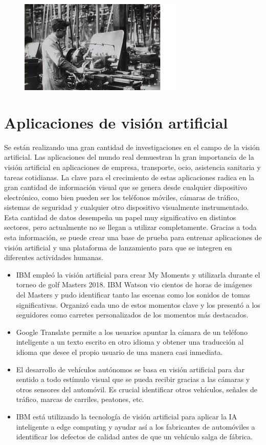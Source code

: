 \begin{figure}[H]
    \centering
    \includegraphics[width=0.5\linewidth]{Images/historia_vision_artificialjpeg.jpeg}
\end{figure}

\newpage
\section{Aplicaciones de visión artificial}
Se están realizando una gran cantidad de investigaciones en el campo de la visión artificial. Las aplicaciones del mundo real demuestran la gran importancia de la visión artificial en aplicaciones de empresa, transporte, ocio, asistencia sanitaria y tareas cotidianas. La clave para el crecimiento de estas aplicaciones radica en la gran cantidad de información visual que se genera desde cualquier dispositivo electrónico, como bien pueden ser los teléfonos móviles, cámaras de tráfico, sistemas de seguridad y cualquier otro dispositivo visualmente instrumentado. Esta cantidad de datos desempeña un papel muy significativo en distintos sectores, pero actualmente no se llegan a utilizar completamente. Gracias a toda esta información, se puede crear una base de prueba para entrenar aplicaciones de visión artificial y una plataforma de lanzamiento para que se integren en diferentes actividades humanas.

\begin{itemize}
    \item IBM empleó la visión artificial para crear My Moments y utilizarla durante el torneo de golf Masters 2018. IBM Watson vio cientos de horas de imágenes del Masters y pudo identificar tanto las escenas como los sonidos de tomas significativas. Organizó cada uno de estos momentos clave y los presentó a los seguidores como carretes personalizados de los momentos más destacados.
    \item Google Translate permite a los usuarios apuntar la cámara de un teléfono inteligente a un texto escrito en otro idioma y obtener una traducción al idioma que desee el propio usuario de una manera casi inmediata.
    \item El desarrollo de vehículos autónomos se basa en visión artificial para dar sentido a todo estímulo visual que se pueda recibir gracias a las cámaras y otros sensores del automóvil. Es crucial identificar otros vehículos, señales de tráfico, marcas de carriles, peatones, etc.
    \item IBM está utilizando la tecnología de visión artificial para aplicar la IA inteligente a edge computing y ayudar así a los fabricantes de automóviles a identificar los defectos de calidad antes de que un vehículo salga de fábrica.
\end{itemize}

